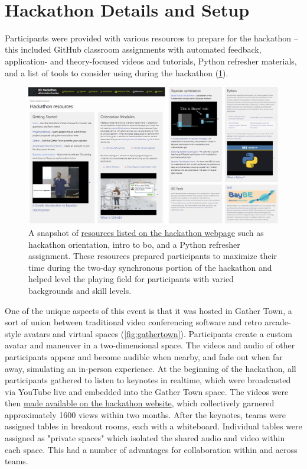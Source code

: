 \documentclass[superscriptaddress, nofootinbib,  amsmath, amssymb, twocolumn]{revtex4-2} %
\let\originalcite\cite
\renewcommand{\cite}[1]{\unskip~\originalcite{#1}}
\begin{document}
\cite{jablonka_14_2023, l.ferguson_conference_2019, mulholland_hackathon_2015, sparks_insights_2024}

\section{Hackathon Details and Setup}

Participants were provided with various resources to prepare for the hackathon – this included GitHub classroom assignments with automated feedback, application- and theory-focused videos and tutorials, Python refresher materials, and a list of tools to consider using during the hackathon (\cref{fig:preparation}).

\begin{figure}
    \centering
    \includegraphics[width=0.98\linewidth]{latex/figures/preparation.png}
    \caption{A snapshot of \href{https://ac-bo-hackathon.github.io/resources/}{resources listed on the hackathon webpage} such as hackathon orientation, intro to \gls{bo}, and a Python refresher assignment. These resources prepared participants to maximize their time during the two-day synchronous portion of the hackathon and helped level the playing field for participants with varied backgrounds and skill levels.}
    \label{fig:preparation}
\end{figure}

One of the unique aspects of this event is that it was hosted in Gather Town, a sort of union between traditional video conferencing software and retro arcade-style avatars and virtual spaces (\cref{fig:gathertown}). Participants create a custom avatar and maneuver in a two-dimensional space. The videos and audio of other participants appear and become audible when nearby, and fade out when far away, simulating an in-person experience. At the beginning of the hackathon, all participants gathered to listen to keynotes in realtime, which were broadcasted via YouTube live and embedded into the Gather Town space. The videos were then \href{https://ac-bo-hackathon.github.io/videos-slides/}{made available on the hackathon website}, which collectively garnered approximately 1600 views within two months. After the keynotes, teams were assigned tables in breakout rooms, each with a whiteboard. Individual tables were assigned as "private spaces" which isolated the shared audio and video within each space. This had a number of advantages for collaboration within and across teams.
\end{document}
